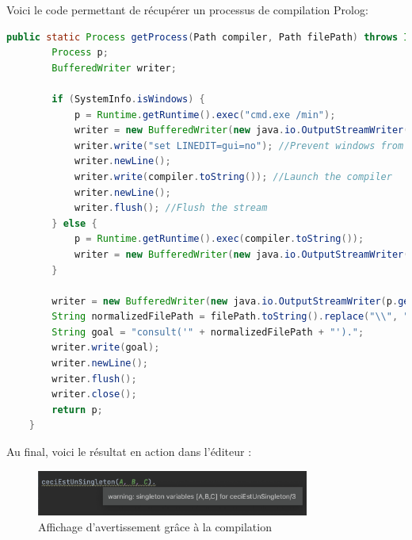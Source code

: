 \noindent Voici le code permettant de récupérer un processus de compilation Prolog:
\begin{lstlisting}[label={lst:get_prolog_process}, caption={Méthode de créer un processus de compilation Prolog}, language=java]
    public static Process getProcess(Path compiler, Path filePath) throws IOException, CantRunException {
        Process p;
        BufferedWriter writer;

        if (SystemInfo.isWindows) {
            p = Runtime.getRuntime().exec("cmd.exe /min");
            writer = new BufferedWriter(new java.io.OutputStreamWriter(p.getOutputStream()));
            writer.write("set LINEDIT=gui=no"); //Prevent windows from opening a console
            writer.newLine();
            writer.write(compiler.toString()); //Launch the compiler
            writer.newLine();
            writer.flush(); //Flush the stream
        } else {
            p = Runtime.getRuntime().exec(compiler.toString());
            writer = new BufferedWriter(new java.io.OutputStreamWriter(p.getOutputStream()));
        }

        writer = new BufferedWriter(new java.io.OutputStreamWriter(p.getOutputStream()));
        String normalizedFilePath = filePath.toString().replace("\\", "/"); //Mandatory for windows
        String goal = "consult('" + normalizedFilePath + "').";
        writer.write(goal);
        writer.newLine();
        writer.flush();
        writer.close();
        return p;
    }
\end{lstlisting}

\noindent Au final, voici le résultat en action dans l'éditeur :
\begin{figure}[h]
    \centering
    \includegraphics[width=0.8\textwidth]{images/background_compilation.png}
    \caption{Affichage d'avertissement grâce à la compilation}
    \label{fig:compilation_warnings}
\end{figure}